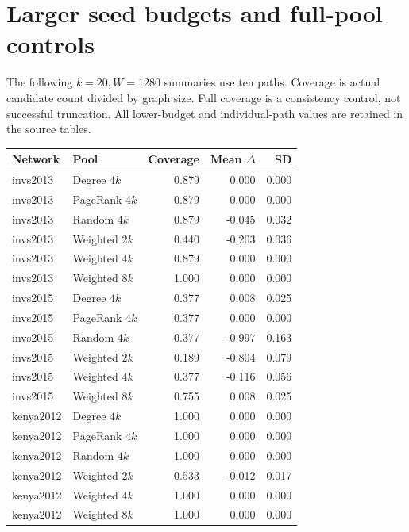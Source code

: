 \documentclass[11pt]{article}
\begin{document}
\section{Larger seed budgets and full-pool controls}
The following $k=20,W=1280$ summaries use ten paths. Coverage is actual candidate count divided by graph size. Full coverage is a consistency control, not successful truncation. All lower-budget and individual-path values are retained in the source tables.
\begin{longtable}{llrrr}\toprule Network & Pool & Coverage & Mean $\Delta$ & SD \\ \midrule\endhead
invs2013 & Degree $4k$ & 0.879 & 0.000 & 0.000 \\
invs2013 & PageRank $4k$ & 0.879 & 0.000 & 0.000 \\
invs2013 & Random $4k$ & 0.879 & -0.045 & 0.032 \\
invs2013 & Weighted $2k$ & 0.440 & -0.203 & 0.036 \\
invs2013 & Weighted $4k$ & 0.879 & 0.000 & 0.000 \\
invs2013 & Weighted $8k$ & 1.000 & 0.000 & 0.000 \\
invs2015 & Degree $4k$ & 0.377 & 0.008 & 0.025 \\
invs2015 & PageRank $4k$ & 0.377 & 0.000 & 0.000 \\
invs2015 & Random $4k$ & 0.377 & -0.997 & 0.163 \\
invs2015 & Weighted $2k$ & 0.189 & -0.804 & 0.079 \\
invs2015 & Weighted $4k$ & 0.377 & -0.116 & 0.056 \\
invs2015 & Weighted $8k$ & 0.755 & 0.008 & 0.025 \\
kenya2012 & Degree $4k$ & 1.000 & 0.000 & 0.000 \\
kenya2012 & PageRank $4k$ & 1.000 & 0.000 & 0.000 \\
kenya2012 & Random $4k$ & 1.000 & 0.000 & 0.000 \\
kenya2012 & Weighted $2k$ & 0.533 & -0.012 & 0.017 \\
kenya2012 & Weighted $4k$ & 1.000 & 0.000 & 0.000 \\
kenya2012 & Weighted $8k$ & 1.000 & 0.000 & 0.000 \\
\bottomrule\end{longtable}
\end{document}
